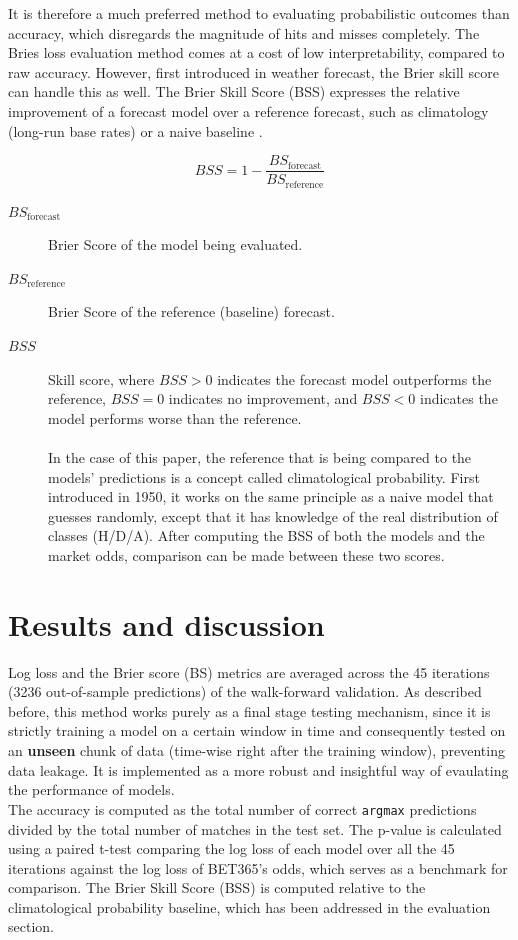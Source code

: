 \documentclass{article}
\begin{document}
It is therefore a much preferred method to evaluating probabilistic outcomes than accuracy, which disregards the magnitude of hits and misses completely. The Bries loss evaluation method comes at a cost of low interpretability, compared to raw accuracy. However, first introduced in weather forecast, the Brier skill score can handle this as well. The Brier Skill Score (BSS) expresses the relative improvement of a forecast model over a reference forecast, such as climatology (long-run base rates) or a naive baseline \cite{BSS}.

\begin{equation}
BSS = 1 - \frac{BS_{\text{forecast}}}{BS_{\text{reference}}}
\end{equation}

\begin{description}
    \item[$BS_{\text{forecast}}$] Brier Score of the model being evaluated.
    \item[$BS_{\text{reference}}$] Brier Score of the reference (baseline) forecast.
    \item[$BSS$]Skill score, where $BSS > 0$ indicates the forecast model outperforms the reference, $BSS = 0$ indicates no improvement, and $BSS < 0$ indicates the model performs worse than the reference.
\\
\\
In the case of this paper, the reference that is being compared to the models' predictions is a concept called climatological probability. First introduced in 1950\cite{Climatology}, it works on the same principle as a naive model that guesses randomly, except that it has knowledge of the real distribution of classes (H/D/A). After computing the BSS of both the models and the market odds, comparison can be made between these two scores. 
\end{description}


\section{Results and discussion}

Log loss and the Brier score (BS) metrics are averaged across the 45 iterations (3236 out-of-sample predictions) of the walk-forward validation. As described before, this method works purely as a final stage testing mechanism, since it is strictly training a model on a certain window in time and consequently tested on an \textbf{unseen} chunk of data (time-wise right after the training window), preventing data leakage. It is implemented as a more robust and insightful way of evaulating the performance of models. 
\\
The accuracy is computed as the total number of correct \texttt{argmax} predictions divided by the total number of matches in the test set. The p-value is calculated using a paired t-test comparing the log loss of each model over all the 45 iterations against the log loss of BET365's odds, which serves as a benchmark for comparison. The Brier Skill Score (BSS) is computed relative to the climatological probability baseline, which has been addressed in the evaluation section.
\end{document}
